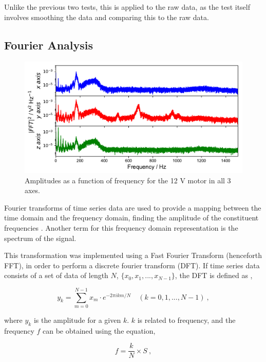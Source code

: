 Unlike the previous two tests, this is applied to the raw data, as the test itself involves smoothing the data and comparing this to the raw data.


\subsection{Fourier Analysis}

\begin{figure}[t]
    \includegraphics[width=1.0\textwidth]{fig/freq_large_4Vnowater.pdf}
    \caption[Fourier Spectrum of 12 V motor in $xyz$ axes]{Amplitudes as a function of frequency for the 12 V motor in all 3 axes. }
    \label{fig:frequencies}
\end{figure}

Fourier transforms of time series data are used to provide a mapping between the time domain and the frequency domain, finding the amplitude of the constituent frequencies \cite{hsu_1984}. Another term for this frequency domain representation is the spectrum of the signal. 

This transformation was implemented using a Fast Fourier Transform (henceforth FFT), in order to perform a discrete fourier transform (DFT). If time series data consists of a set of data of length $N$, $\{ x_0, x_1,...,x_{N-1} \}$, the DFT is defined as \cite{hsu_1984},

\begin{equation}
    y_k = \sum_{m=0}^{N-1} x_m \cdot e^{-2\pi ikm/N} \quad (k = 0,1,...,N-1)~,
    \label{eq:DFT}
\end{equation}

where $y_k$ is the amplitude for a given $k$. $k$ is related to frequency, and the frequency $f$ can be obtained using the equation,

\begin{equation}
    f = \dfrac{k}{N} \times S~,
    \label{eq:freq_from_k}
\end{equation}

